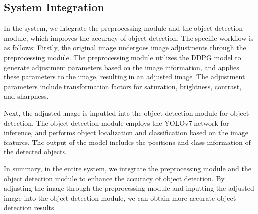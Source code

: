 \documentclass{PHlab-thesis}
\begin{document}
\subsection{System Integration}
In the system, we integrate the preprocessing module and the object detection module, which improves the accuracy of object detection. The specific workflow is as follows: Firstly, the original image undergoes image adjustments through the preprocessing module. The preprocessing module utilizes the DDPG model to generate adjustment parameters based on the image information, and applies these parameters to the image, resulting in an adjusted image. The adjustment parameters include transformation factors for saturation, brightness, contrast, and sharpness.

Next, the adjusted image is inputted into the object detection module for object detection. The object detection module employs the YOLOv7 network for inference, and performs object localization and classification based on the image features. The output of the model includes the positions and class information of the detected objects.

In summary, in the entire system, we integrate the preprocessing module and the object detection module to enhance the accuracy of object detection. By adjusting the image through the preprocessing module and inputting the adjusted image into the object detection module, we can obtain more accurate object detection results. 
\end{document}

